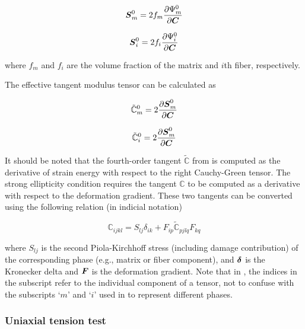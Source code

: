 \documentclass[12pt]{article}
\numberwithin{equation}{section}
\begin{document}
\begin{equation}\label{eq:aniso_S0m}
  {\boldsymbol{S}}_m^0 = 
    2 f_m \frac{\partial \Psi_m^0}{\partial{\boldsymbol{C}}}
\end{equation}

\begin{equation}\label{eq:aniso_S0i}
  {\boldsymbol{S}}_i^0 = 
    2 f_i \frac{\partial \Psi_i^0}{\partial{\boldsymbol{C}}}
\end{equation}

where $f_m$ and $f_i$ are the volume fraction of the matrix and $i$th fiber, respectively.

The effective tangent modulus tensor can be calculated as

\begin{equation}\label{eq:aniso_tangent1}
  \tilde{\mathbb{C}}_m^0 = 
    2 \frac{\partial {\boldsymbol{S}}_m^0}{\partial{\boldsymbol{C}}}
\end{equation}

\begin{equation}\label{eq:aniso_tangent2}
  \tilde{\mathbb{C}}_i^0 =  
    2 \frac{\partial {\boldsymbol{S}}_m^0}{\partial{\boldsymbol{C}}}
\end{equation}

It should be noted that the fourth-order tangent $\tilde{\mathbb{C}}$ 
from  is computed as the derivative of strain 
energy with respect to the right Cauchy-Green tensor. The strong 
ellipticity condition  requires the 
tangent $\mathbb{C}$ to be computed as a derivative with respect to 
the deformation gradient. These two tangents can be converted using 
the following relation (in indicial notation)

\begin{equation}\label{eq:aniso_tangent3}
  \mathbb{C}_{ijkl} = S_{lj} \delta_{ik}
    + F_{ip} \tilde{\mathbb{C}}_{pjlq} F_{kq}
\end{equation}

where $S_{lj}$ is the second Piola-Kirchhoff stress (including 
damage contribution) of the corresponding phase (e.g., matrix or fiber 
component), and ${\boldsymbol{\delta}}$ is the Kronecker delta and ${\boldsymbol{F}}$ is the 
deformation gradient. Note that in , the 
indices in the subscript refer to the individual component of a 
tensor, not to confuse with the subscripts `$m$' and `$i$' used in 
 to represent different phases.

\subsubsection{Uniaxial tension test}
\end{document}

